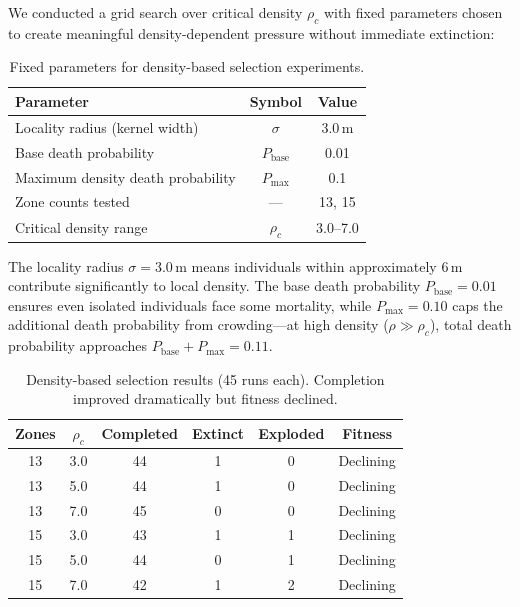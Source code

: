\documentclass[dvipsnames,format=sigconf,anonymous=false,review=false]{acmart}
\begin{document}
We conducted a grid search over critical density $\rho_c$ with fixed parameters chosen to create meaningful density-dependent pressure without immediate extinction:

\begin{table}[H]
\centering
\begin{tabular}{@{}lcc@{}}
\toprule
Parameter & Symbol & Value \\
\midrule
Locality radius (kernel width) & $\sigma$ & 3.0\,m \\
Base death probability & $P_{\text{base}}$ & 0.01 \\
Maximum density death probability & $P_{\text{max}}$ & 0.1 \\
Zone counts tested & --- & 13, 15 \\
Critical density range & $\rho_c$ & 3.0--7.0 \\
\bottomrule
\end{tabular}
\caption{Fixed parameters for density-based selection experiments.}
\label{tab:density_params}
\end{table}

The locality radius $\sigma = 3.0$\,m means individuals within approximately 6\,m contribute significantly to local density. The base death probability $P_{\text{base}} = 0.01$ ensures even isolated individuals face some mortality, while $P_{\text{max}} = 0.10$ caps the additional death probability from crowding---at high density ($\rho \gg \rho_c$), total death probability approaches $P_{\text{base}} + P_{\text{max}} = 0.11$.

\begin{table}[H]
\centering
\begin{tabular}{@{}cccccc@{}}
\toprule
Zones & $\rho_c$ & Completed & Extinct & Exploded & Fitness \\
\midrule
13 & 3.0 & 44 & 1 & 0 & Declining \\
13 & 5.0 & 44 & 1 & 0 & Declining \\
13 & 7.0 & 45 & 0 & 0 & Declining \\
15 & 3.0 & 43 & 1 & 1 & Declining \\
15 & 5.0 & 44 & 0 & 1 & Declining \\
15 & 7.0 & 42 & 1 & 2 & Declining \\
\bottomrule
\end{tabular}
\caption{Density-based selection results (45 runs each). Completion improved dramatically but fitness declined.}
\label{tab:density}
\end{table}
\end{document}
